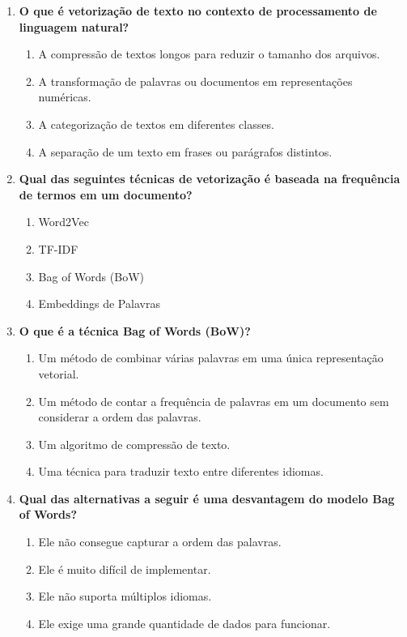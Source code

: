\documentclass[14pt,a4paper,oneside]{book}
\begin{document}
\begin{enumerate}
\item \textbf{O que é vetorização de texto no contexto de processamento de linguagem natural?} 
\begin{enumerate}[label=\alph*)]
\item A compressão de textos longos para reduzir o tamanho dos arquivos. 
\item A transformação de palavras ou documentos em representações numéricas. 
\item A categorização de textos em diferentes classes. 
\item A separação de um texto em frases ou parágrafos distintos. 
\end{enumerate}

\item \textbf{Qual das seguintes técnicas de vetorização é baseada na frequência de termos em um documento?} 
\begin{enumerate}[label=\alph*)]
\item Word2Vec 
\item TF-IDF 
\item Bag of Words (BoW) 
\item Embeddings de Palavras 
\end{enumerate}

\item \textbf{O que é a técnica Bag of Words (BoW)?} 
\begin{enumerate}[label=\alph*)]
\item Um método de combinar várias palavras em uma única representação vetorial. 
\item Um método de contar a frequência de palavras em um documento sem considerar a ordem das palavras. 
\item Um algoritmo de compressão de texto. 
\item Uma técnica para traduzir texto entre diferentes idiomas. 
\end{enumerate}

\item \textbf{Qual das alternativas a seguir é uma desvantagem do modelo Bag of Words?} 
\begin{enumerate}[label=\alph*)]
\item Ele não consegue capturar a ordem das palavras. 
\item Ele é muito difícil de implementar. 
\item  Ele não suporta múltiplos idiomas. 
\item  Ele exige uma grande quantidade de dados para funcionar. 
\end{enumerate}


\end{enumerate}
\end{document}
